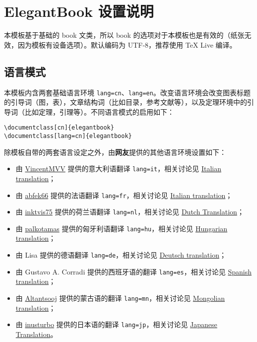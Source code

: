 \chapter{ElegantBook 设置说明}

本模板基于基础的 book 文类，所以 book 的选项对于本模板也是有效的（纸张无效，因为模板有设备选项）。默认编码为 UTF-8，推荐使用 \TeX{} Live 编译。

\section{语言模式}
本模板内含两套基础语言环境 \lstinline{lang=cn}、\lstinline{lang=en}。改变语言环境会改变图表标题的引导词（图，表），文章结构词（比如目录，参考文献等），以及定理环境中的引导词（比如定理，引理等）。不同语言模式的启用如下：
\begin{lstlisting}
\documentclass[cn]{elegantbook} 
\documentclass[lang=cn]{elegantbook}
\end{lstlisting}

除模板自带的两套语言设定之外，由\textbf{网友}提供的其他语言环境设置如下：
\begin{itemize}
  \item 由 \href{https://github.com/VincentMVV}{VincentMVV} 提供的意大利语翻译 \lstinline{lang=it}，相关讨论见 \href{https://github.com/ElegantLaTeX/ElegantBook/issues/85}{Italian translation}；
  \item 由 \href{https://github.com/abfek66}{abfek66} 提供的法语翻译 \lstinline{lang=fr}，相关讨论见 \href{https://github.com/ElegantLaTeX/ElegantBook/issues/85}{Italian translation}；
  \item 由 \href{https://github.com/inktvis75}{inktvis75} 提供的荷兰语翻译 \lstinline{lang=nl}，相关讨论见 \href{https://github.com/ElegantLaTeX/ElegantBook/issues/108}{Dutch Translation}；
  \item 由 \href{https://github.com/palkotamas}{palkotamas} 提供的匈牙利语翻译 \lstinline{lang=hu}，相关讨论见 \href{https://github.com/ElegantLaTeX/ElegantBook/issues/111}{Hungarian translation}；
  \item 由 Lisa 提供的德语翻译 \lstinline{lang=de}，相关讨论见 \href{https://github.com/ElegantLaTeX/ElegantBook/issues/113}{Deutsch translation}；
  \item 由 Gustavo A. Corradi 提供的西班牙语的翻译 \lstinline{lang=es}，相关讨论见 \href{https://github.com/ElegantLaTeX/ElegantBook/issues/133}{Spanish translation}；
  \item 由 \href{https://github.com/Altantsooj}{Altantsooj} 提供的蒙古语的翻译 \lstinline{lang=mn}，相关讨论见 \href{https://github.com/ElegantLaTeX/ElegantBook/issues/137}{Mongolian translation}；
  \item 由 \href{https://github.com/inusturbo}{inusturbo} 提供的日本语的翻译 \lstinline{lang=jp}，相关讨论见 \href{https://github.com/ElegantLaTeX/ElegantBook/issues/172}{Japanese Translation}。
\end{itemize}



